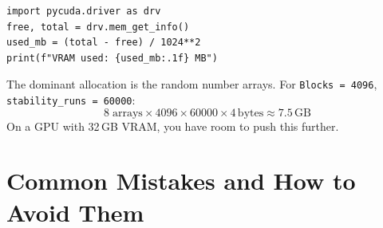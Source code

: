 \documentclass[12pt,a4paper]{article}
\newcommand{\param}[1]{\texttt{#1}}
\begin{document}
\begin{lstlisting}[style=python]
import pycuda.driver as drv
free, total = drv.mem_get_info()
used_mb = (total - free) / 1024**2
print(f"VRAM used: {used_mb:.1f} MB")
\end{lstlisting}

The dominant allocation is the random number arrays. For
\param{Blocks = 4096}, \param{stability\_runs = 60000}:
\[
  8 \;\text{arrays} \times 4096 \times 60000 \times 4\,\text{bytes}
  \approx 7.5\,\text{GB}
\]
On a GPU with 32\,GB VRAM, you have room to push this further.

\section{Common Mistakes and How to Avoid Them}
\label{sec:mistakes}
\end{document}
